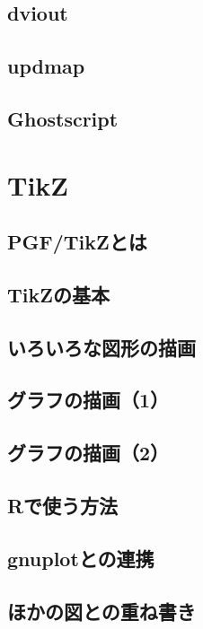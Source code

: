 \documentclass{jsbook}
\begin{document}
\section{dviout}

\section{updmap}

\section{Ghostscript}

\chapter{TikZ}

\section{PGF/TikZとは}

\section{TikZの基本}

\section{いろいろな図形の描画}

\section{グラフの描画（1）}

\section{グラフの描画（2）}

\section{Rで使う方法}

\section{gnuplotとの連携}

\section{ほかの図との重ね書き}
\end{document}
